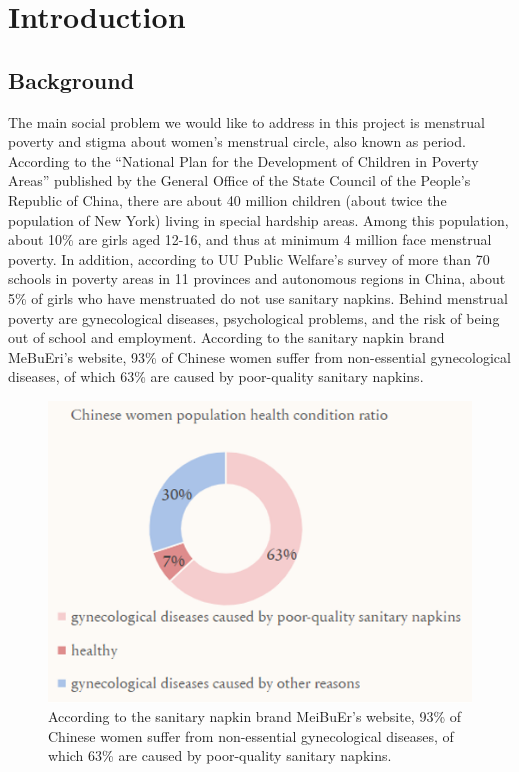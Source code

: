 \section{Introduction}
\subsection{Background}
The main social problem we would like to address in this project is menstrual poverty and stigma about women's menstrual circle, also known as period.
According to the “National Plan for the Development of Children in Poverty Areas” published by the General Office of the State Council of the People's Republic of China, there are about 40 million children (about twice the population of New York) living in special hardship areas. Among this population, about 10\% are girls aged 12-16, and thus at minimum 4 million face menstrual poverty. In addition, according to UU Public Welfare's survey of more than 70 schools in poverty areas in 11 provinces and autonomous regions in China, about 5\% of girls who have menstruated do not use sanitary napkins. Behind menstrual poverty are gynecological diseases, psychological problems, and the risk of being out of school and employment. According to the sanitary napkin brand MeBuEri's website, 93\% of Chinese women suffer from non-essential gynecological diseases, of which 63\% are caused by poor-quality sanitary napkins.

\begin{figure}[ht]
    \centering
    \includegraphics[width=\columnwidth]{assets/napkin_brand.png}
    \caption{According to the sanitary napkin brand MeiBuEr's website, 93\% of Chinese women suffer from non-essential gynecological diseases, of which 63\% are caused by poor-quality sanitary napkins.}
    \label{fig:napkin_brand}
\end{figure}

